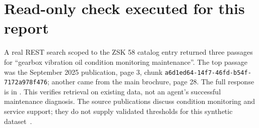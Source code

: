 \section{Read-only check executed for this report}
A real REST search scoped to the ZSK 58 catalog entry returned three passages for ``gearbox vibration oil condition monitoring maintenance''. The top passage was the September 2025 publication, page 3, chunk \texttt{a6d1ed64-14f7-46fd-b54f-7172a978f476}; another came from the main brochure, page 28. The full response is in . This verifies retrieval on existing data, not an agent's successful maintenance diagnosis. The source publications discuss condition monitoring and service support; they do not supply validated thresholds for this synthetic dataset~\cite{coperion2025,coperionbrochure,coperionservice}.
